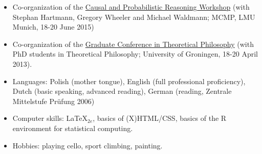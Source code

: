 \documentclass[a4paper,12pt]{article}
\begin{document}
\begin{small}
  
  \begin{itemize}
  \item Co-organization of the \href{http://lmu.de/cpr2015}{Causal and Probabilistic Reasoning Workshop} (with Stephan Hartmann, Gregory Wheeler and Michael Waldmann; MCMP, LMU Munich, 18-20 June 2015)
  \item Co-organization of the
    \href{http://www.philos.rug.nl/GCTP2013/}{Graduate Conference in
      Theoretical Philosophy} (with PhD students in Theoretical Philosophy; University of Groningen, 18-20 April 2013).
  \end{itemize}


  \begin{itemize}
  \item Languages: Polish (mother tongue), English (full professional proficiency), Dutch
    (basic speaking, advanced reading), German (reading, Zentrale
    Mittelstufe Pr\"ufung 2006)
  \item Computer skills: \LaTeX$_{2e}$, basics of
    (X)HTML/CSS, basics of the R environment for statistical
    computing.

  \item Hobbies: playing cello, sport climbing, painting.
  \end{itemize}


\end{small}
\end{document}
